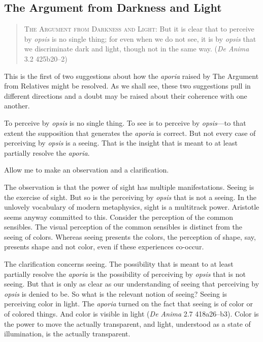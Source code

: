 
\subsection{The Argument from Darkness and Light} %
\label{sub:the_argument_from_darkness}

\begin{quote}
	\textsc{The Argument from Darkness and Light}: But it is clear that to perceive by \emph{opsis} is no single thing; for even when we do not see, it is by \emph{opsis} that we discriminate dark and light, though not in the same way. (\emph{De Anima} 3.2 425b20–2)
\end{quote}

This is the first of two suggestions about how the \emph{aporia} raised by The Argument from Relatives might be resolved. As we shall see, these two suggestions pull in different directions and a doubt may be raised about their coherence with one another.


To perceive by \emph{opsis} is no single thing. To see is to perceive by \emph{opsis}—to that extent the supposition that generates the \emph{aporia} is correct. But not every case of perceiving by \emph{opsis} is a seeing. That is the insight that is meant to at least partially resolve the \emph{aporia}.

Allow me to make an observation and a clarification.

The observation is that the power of sight has multiple manifestations. Seeing is the exercise of sight. But so is the perceiving by \emph{opsis} that is not a seeing. In the unlovely vocabulary of modern metaphysics, sight is a multitrack power. Aristotle seems anyway committed to this. Consider the perception of the common sensibles. The visual perception of the common sensibles is distinct from the seeing of colors. Whereas seeing presents the colors, the perception of shape, say, presents shape and not color, even if these experiences co-occur.

The clarification concerns seeing. The possibility that is meant to at least partially resolve the \emph{aporia} is the possibility of perceiving by \emph{opsis} that is not seeing. But that is only as clear as our understanding of seeing that perceiving by \emph{opsis} is denied to be. So what is the relevant notion of seeing? Seeing is perceiving color in light. The \emph{aporia} turned on the fact that seeing is of color or of colored things. And color is visible in light (\emph{De Anima} 2.7 418a26–b3). Color is the power to move the actually transparent, and light, understood as a state of illumination, is the actually transparent.

